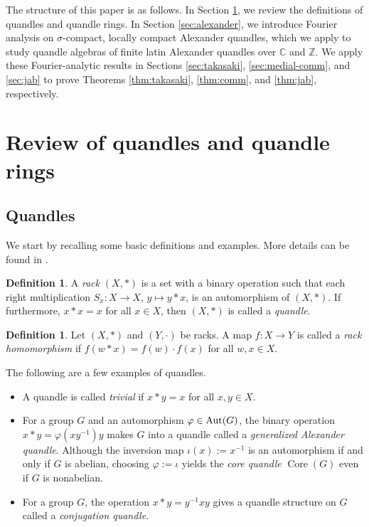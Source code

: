 \documentclass[12pt]{amsart}
\theoremstyle{definition}
\newtheorem{definition}[thm]{Definition}
\theoremstyle{remark}
\newcommand{\C}{\mathbb{C}}
\newcommand{\Z}{\mathbb{Z}}
\renewcommand{\phi}{\varphi}
\def\Core{\operatorname{Core}}
\begin{document}
The structure of this paper is as follows. 
In Section \ref{review}, we review the definitions of quandles and quandle rings. In Section \ref{sec:alexander}, we introduce Fourier analysis on $\sigma$-compact, locally compact Alexander quandles, which we apply to study quandle algebras of finite latin Alexander quandles over $\C$ and $\Z$. We apply these Fourier-analytic results in Sections \ref{sec:takasaki}, \ref{sec:medial-comm}, and \ref{sec:jab} to prove Theorems \ref{thm:takasaki}, \ref{thm:comm}, and \ref{thm:jab}, respectively.

\section{Review of quandles and quandle rings}\label{review}

\subsection{Quandles}
We start by recalling some basic definitions and examples.  More details can be found in \cites{Joyce, Matveev, EN, BES}.

\begin{definition}
A \emph{rack} $(X,*)$ is a set  with a binary operation such that each right multiplication $S_x\colon X \rightarrow X$, $y \mapsto y*x$, is an automorphism of $(X,*)$.  If furthermore, $x*x=x$ for all $x \in X$, then  $(X,*)$ is called a \emph{quandle}.
\end{definition}
\begin{definition}
    Let $(X,*)$ and $(Y,\cdot)$ be racks. A map $f\colon X\to Y$ is called a \emph{rack homomorphism} if $f(w*x)=f(w)\cdot f(x)$ for all $w,x\in X$.
\end{definition}
The following are a few examples of quandles.
\begin{itemize}
\item
 A quandle is called \emph{trivial} if $x*y=x$ for all $ x ,y\in X$.

\item
For a group $G$ and an automorphism $\phi \in {\rm Aut}(G)$, the binary operation $x*y=\phi (xy^{-1}) y $ makes $G$ into a quandle called a \emph{generalized Alexander quandle}. Although the inversion map $\iota(x):=x^{-1}$ is an automorphism if and only if $G$ is abelian, choosing $\phi:=\iota$ yields the \emph{core quandle} $\Core(G)$ even if $G$ is nonabelian.

\item
For a group $G$, the operation $x*y=y^{-1}xy$ gives a quandle structure on $G$ called a \emph{conjugation quandle}.

\end{itemize}
\end{document}
